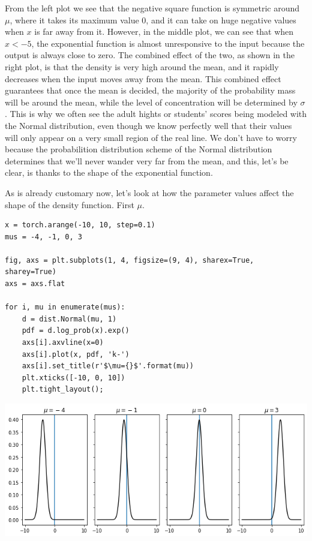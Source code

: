 \documentclass[11pt]{article}
\begin{document}
From the left plot we see that the negative square function is symmetric around \(\mu\), where it takes its maximum value \(0\), and it can take on huge negative values when \(x\) is far away from it. However, in the middle plot, we can see that when \(x\lt-5\), the exponential function is almost unresponsive to the input because the output is always close to zero. The combined effect of the two, as shown in the right plot, is that the density is very high around the mean, and it rapidly decreases when the input moves away from the mean. This combined effect guarantees that once the mean is decided, the majority of the probability mass will be around the mean, while the level of concentration will be determined by \(\sigma\). This is why we often see the adult hights or students' scores being modeled with the Normal distribution, even though we know perfectly well that their values will only appear on a very small region of the real line. We don't have to worry because the probabilition distribution scheme of the Normal distribution determines that we'll never wander very far from the mean, and this, let's be clear, is thanks to the shape of the exponential function.

As is already customary now, let's look at how the parameter values affect the shape of the density function. First \(\mu\).

\begin{verbatim}
x = torch.arange(-10, 10, step=0.1)
mus = -4, -1, 0, 3

fig, axs = plt.subplots(1, 4, figsize=(9, 4), sharex=True, sharey=True)
axs = axs.flat

for i, mu in enumerate(mus):
    d = dist.Normal(mu, 1)
    pdf = d.log_prob(x).exp()
    axs[i].axvline(x=0)
    axs[i].plot(x, pdf, 'k-')
    axs[i].set_title(r'$\mu={}$'.format(mu))
    plt.xticks([-10, 0, 10])
    plt.tight_layout();
\end{verbatim}

\begin{center}
\includegraphics[width=.9\linewidth]{./.ob-jupyter/3ec562ebdc01c54f7f46570b41bbac3db8641c92.png}
\end{center}
\end{document}
